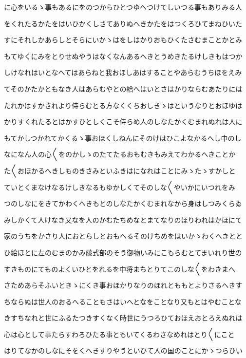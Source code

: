 \documentclass[a4paper,11pt,landscape]{ltjtarticle}
\begin{document}
に心をいるゝ事もあるにをのつからひとつゆへつけてしいつる事もありみる人
\par\medskip
をくれたるかたをはいひかくしさてありぬへきかたをはつくろひてまねひいた
\par\medskip
すにそれしかあらしとそらにいかゝはをしはかりおもひくたさむまことかとみ
\par\medskip
もてゆくにみをとりせぬやうはなくなんあるへきとうめきたるけしきもはつか
\par\medskip
しけなれはいとなへてはあらねと我おほしあはすることやあらむうちほをえみ
\par\medskip
てそのかたかともなき人はあらむやとの給へはいとさはかりならむあたりには
\par\medskip
たれかはすかされより侍らむとる方なくくちおしきゝはというなりとおほゆは
\par\medskip
かりすくれたるとはかすひとしくこそ侍らめ人のしなたかくむまれぬれは人に
\par\medskip
もてかしつかれてかくるゝ事おほくしねんにそのけはひこよなかるへし中のし
\par\medskip
なになん人の心〱をのかしゝのたてたるおもむきもみえてわかるへきことか
\par\medskip
た〱おほかるへきしものきさみといふきはになれはことにみゝたゝすかしと
\par\medskip
ていとくまなけなるけしきなるもゆかしくてそのしな〱やいかにいつれをみ
\par\medskip
つのしなにをきてかわくへきもとのしなたかくむまれなから身はしつみくらゐ
\par\medskip
みしかくて人けなき又なを人のかむたちめなとまてなりのほりわれはかほにて
\par\medskip
家のうちをかさり人におとらしとおもへるそのけちめをはいかゝわくへきとと
\par\medskip
ひ給ほとに左のむまのかみ藤式部のそう御物いみにこもらむとてまいれり世の
\par\medskip
すきものにてものよくいひとをれるを中将まちとりてこのしな〱をわきまへ
\par\medskip
さためあらそふいときゝにくき事おほかりなりのほれとももとよりさるへきす
\par\medskip
ちならぬは世人のおるへることもさはいへとなをことなり又もとはやむことな
\par\medskip
きすちなれと世にふるたつきすくなく時世にうつろひておほえおとろえぬれは
\par\medskip
心は心として事たらすわろひたる事ともいてくるわさなめれはとり〱にこと
\par\medskip
はりてなかのしなにそをくへきすりやうといひて人の国のことにかゝつらひい
\end{document}
